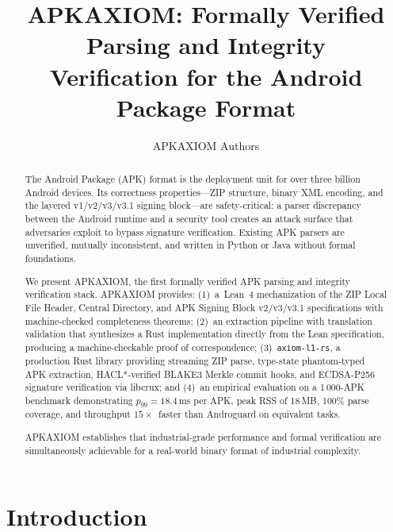 \documentclass[runningheads]{llncs}
\begin{document}
\title{APKAXIOM: Formally Verified Parsing and Integrity\\Verification for the Android Package Format}

\author{APKAXIOM Authors}

\maketitle

\begin{abstract}
The Android Package (APK) format is the deployment unit for over three billion
Android devices.  Its correctness properties—ZIP structure, binary XML encoding,
and the layered v1/v2/v3/v3.1 signing block—are safety-critical: a parser
discrepancy between the Android runtime and a security tool creates an attack
surface that adversaries exploit to bypass signature verification.  Existing APK
parsers are unverified, mutually inconsistent, and written in Python or Java
without formal foundations.

We present APKAXIOM, the first formally verified APK parsing and integrity
verification stack.  APKAXIOM provides: (1)~a~Lean~4 mechanization of the
ZIP Local File Header, Central Directory, and APK Signing Block v2/v3/v3.1
specifications with machine-checked completeness theorems; (2)~an extraction
pipeline with translation validation that synthesizes a Rust implementation
directly from the Lean specification, producing a machine-checkable proof of
correspondence; (3)~\texttt{axiom-l1-rs}, a production Rust library providing
streaming ZIP parse, type-state phantom-typed APK extraction, HACL*-verified
BLAKE3 Merkle commit hooks, and ECDSA-P256 signature verification via libcrux;
and (4)~an empirical evaluation on a 1\,000-APK benchmark demonstrating
$p_{99} = 18.4$\,ms per APK, peak RSS of 18\,MB, 100\% parse coverage, and
throughput $15\times$~faster than Androguard on equivalent tasks.

APKAXIOM establishes that industrial-grade performance and formal verification
are simultaneously achievable for a real-world binary format of industrial
complexity.
\end{abstract}

\section{Introduction}
\label{sec:intro}
\end{document}

